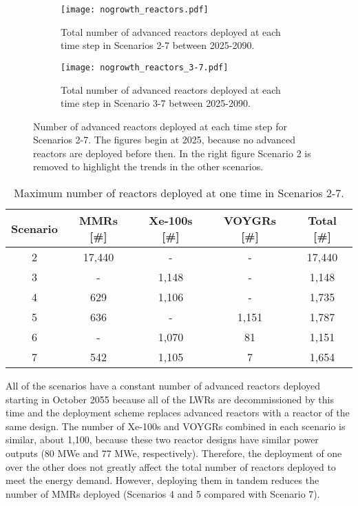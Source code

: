 \begin{figure}[h!]
    \centering
    \begin{subfigure}[b]{0.45\textwidth}
        \centering
        \texttt{[image: nogrowth\_reactors.pdf]}
        \caption{Total number of advanced reactors deployed at 
        each time step in Scenarios 2-7 between 2025-2090.}
        \label{fig:nogrowth_reactors_all}
    \end{subfigure}
    \hfill
    \begin{subfigure}[b]{0.45\textwidth}
        \centering
        \texttt{[image: nogrowth\_reactors\_3-7.pdf]}
        \caption{Total number of advanced reactors deployed at 
        each time step in Scenario 3-7 between 2025-2090.}
        \label{fig:nogrowth_reactors_3-7}
    \end{subfigure}
       \caption{Number of advanced reactors deployed at each time step 
       for Scenarios 2-7. The figures begin at 2025, because no advanced 
       reactors are deployed before then. In the right figure Scenario 
       2 is removed to highlight the trends in the other scenarios.}
       \label{fig:nogrowth_reactors}
\end{figure}

\begin{table}[h!]
    \centering 
    \caption{Maximum number of reactors deployed at one time in 
    Scenarios 2-7.}
    \label{tab:reactors_nogrowth}
    \begin{tabular}{c c c c c}
        \hline
        Scenario & \glspl{MMR} [\#] & Xe-100s [\#] & VOYGRs [\#] 
        & Total [\#]\\\hline
        2 & 17,440 & - & - & 17,440\\
        3 & - & 1,148 & - & 1,148\\
        4 & 629 & 1,106 & - & 1,735\\
        5 & 636 & - & 1,151 & 1,787\\
        6 & - & 1,070 & 81 & 1,151\\
        7 & 542 & 1,105 & 7 & 1,654\\
        \hline
    \end{tabular}
\end{table}

All of the scenarios have a constant number of advanced reactors 
deployed starting in October 2055 because all of the \glspl{LWR} are 
decommissioned by this time and the deployment scheme replaces advanced
reactors with a reactor of the same design. The number of Xe-100s and VOYGRs combined 
in each scenario is similar, about 1,100, because these two reactor 
designs have similar power outputs (80 MWe and 77 MWe, respectively). 
Therefore, the deployment of one over the other does 
not greatly affect the total number of reactors deployed to meet the 
energy demand. However, 
deploying them in tandem reduces the number of \glspl{MMR} deployed
(Scenarios 4 and 5 compared with Scenario 7). 

